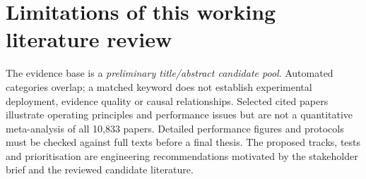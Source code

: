 \documentclass[10pt,a4paper]{article}
\begin{document}
\section{Limitations of this working literature review}
The evidence base is a \emph{preliminary title/abstract candidate pool}. Automated categories overlap; a matched keyword does not establish experimental deployment, evidence quality or causal relationships. Selected cited papers illustrate operating principles and performance issues but are not a quantitative meta-analysis of all 10,833 papers. Detailed performance figures and protocols must be checked against full texts before a final thesis. The proposed tracks, tests and prioritisation are engineering recommendations motivated by the stakeholder brief and the reviewed candidate literature.

\printbibliography[title={References}]
\end{document}
